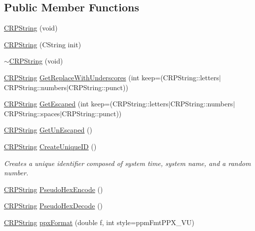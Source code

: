 \subsection*{Public Member Functions}
\begin{DoxyCompactItemize}
\item 
\hyperlink{classCRPString_a9f11032df8603145bc2dcf362e17b8b9}{CRPString} (void)
\item 
\hyperlink{classCRPString_a24dcee7ab95d0f8d30ced81278c76457}{CRPString} (CString init)
\item 
\hyperlink{classCRPString_a76748d02f8bd3e4d44d13ca243e17a0d}{$\sim$CRPString} (void)
\item 
\hyperlink{classCRPString}{CRPString} \hyperlink{classCRPString_ab55c3eb38f02b0f1e212171703aabb73}{GetReplaceWithUnderscores} (int keep=(CRPString::letters$|$CRPString::numbers$|$CRPString::punct))
\item 
\hyperlink{classCRPString}{CRPString} \hyperlink{classCRPString_a287f8e6f51feb0d60efdad915097984e}{GetEscaped} (int keep=(CRPString::letters$|$CRPString::numbers$|$CRPString::spaces$|$CRPString::punct))
\item 
\hyperlink{classCRPString}{CRPString} \hyperlink{classCRPString_a0d9fad03c6ec2c4fc1ea62e9af2a9fad}{GetUnEscaped} ()
\item 
\hyperlink{classCRPString}{CRPString} \hyperlink{classCRPString_a0382de4893ea232e29afad535a67a601}{CreateUniqueID} ()
\begin{DoxyCompactList}\small\item\em Creates a unique identifier composed of system time, system name, and a random number. \item\end{DoxyCompactList}\item 
\hyperlink{classCRPString}{CRPString} \hyperlink{classCRPString_a1d24b77d94ec9357575b20cbd756bb80}{PseudoHexEncode} ()
\item 
\hyperlink{classCRPString}{CRPString} \hyperlink{classCRPString_afdad60e2b6a6875041630c6d87bfda62}{PseudoHexDecode} ()
\item 
\hyperlink{classCRPString}{CRPString} \hyperlink{classCRPString_a01d8cb97d36a898804a802f10d53b993}{ppxFormat} (double f, int style=ppmFmtPPX\_\-VU)
\end{DoxyCompactItemize}


